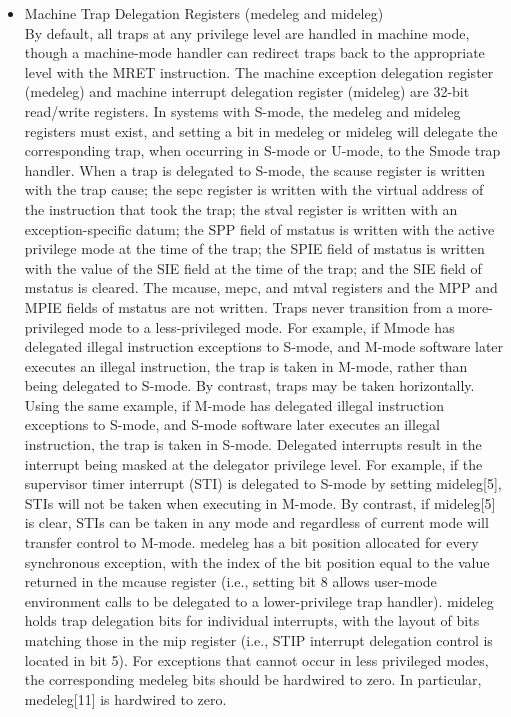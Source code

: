 \documentclass[../main.tex]{subfiles}
\begin{document}
\begin{itemize}
    \item Machine Trap Delegation Registers (medeleg and mideleg)\\
        By default, all traps at any privilege level are handled in machine mode, though a machine-mode handler can redirect traps back to the appropriate level with the MRET instruction. The machine exception delegation register (medeleg) and machine interrupt delegation register (mideleg) are 32-bit read/write registers. In systems with S-mode, the medeleg and mideleg registers must exist, and setting a bit in medeleg or mideleg will delegate the corresponding trap, when occurring in S-mode or U-mode, to the Smode trap handler. When a trap is delegated to S-mode, the scause register is written with the trap cause; the sepc register is written with the virtual address of the instruction that took the trap; the stval register is written with an exception-specific datum; the SPP field of mstatus is written with the active privilege mode at the time of the trap; the SPIE field of mstatus is written with the value of the SIE field at the time of the trap; and the SIE field of mstatus is cleared. The mcause, mepc, and mtval registers and the MPP and MPIE fields of mstatus are not written. Traps never transition from a more-privileged mode to a less-privileged mode. For example, if Mmode has delegated illegal instruction exceptions to S-mode, and M-mode software later executes an illegal instruction, the trap is taken in M-mode, rather than being delegated to S-mode. By contrast, traps may be taken horizontally. Using the same example, if M-mode has delegated illegal instruction exceptions to S-mode, and S-mode software later executes an illegal instruction, the trap is taken in S-mode. Delegated interrupts result in the interrupt being masked at the delegator privilege level. For example, if the supervisor timer interrupt (STI) is delegated to S-mode by setting mideleg[5], STIs will not be taken when executing in M-mode. By contrast, if mideleg[5] is clear, STIs can be taken in any mode and regardless of current mode will transfer control to M-mode. medeleg has a bit position allocated for every synchronous exception, with the index of the bit position equal to the value returned in the mcause register (i.e., setting bit 8 allows user-mode environment calls to be delegated to a lower-privilege trap handler). mideleg holds trap delegation bits for individual interrupts, with the layout of bits matching those in the mip register (i.e., STIP interrupt delegation control is located in bit 5). For exceptions that cannot occur in less privileged modes, the corresponding medeleg bits should be hardwired to zero. In particular, medeleg[11] is hardwired to zero.\\
            

\end{itemize}
\end{document}
